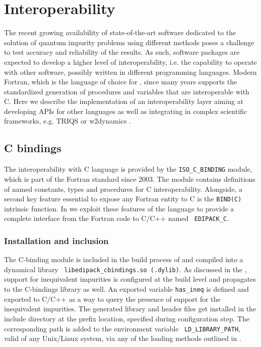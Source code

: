 \documentclass[edipack_sp.tex]{subfiles}
\begin{document}
\section{Interoperability}\label{SecInterop}
The recent growing availability of state-of-the-art software dedicated
to the solution of quantum impurity problems using different methods \cite{Bulla2008RMP,Parcollet2015CPC,Seth2016CPC,Bauernfeind2017PRX,Ganahl2015PRB,Wallerberger2019CPC,Mejuto-Zaera2020PRB}
poses a challenge to test accuracy and reliability of the
results.
As such, software packages are expected to develop a higher level of interoperability, i.e. the capability to operate with other software, possibly written in different programming languages.
Modern Fortran, which is the language of choice for \NAME, since many
years supports the standardized generation of procedures and
variables that are interoperable with C.
Here we describe the implementation of an interoperability layer aiming at developing APIs for other languages as well as 
integrating \NAME in complex scientific frameworks, e.g. TRIQS \cite{Parcollet2015CPC} or w2dynamics \cite{Wallerberger2019CPC}. 

\subsection{C bindings}\label{sSecInteropCbindings}
The interoperability with C language is provided by the
{\tt ISO\_C\_BINDING} module, which is part of the Fortran
standard since 2003\cite{Reid2003CISE,Reid2007SFF}. The module contains definitions of named
constants, types and procedures for C interoperability.
Alongside, a second key feature essential to expose any Fortran entity to C is the {\tt BIND(C)} intrinsic function.
In \NAME we exploit these features of the language to provide a
complete interface from the Fortran code to C/C++ named {\tt
  EDIPACK\_C}. 


\subsubsection{Installation and inclusion}\label{sSecInteropCbindingsInstallation}
The C-binding module is included in the build process of \NAME and
compiled into a dynamical library {\tt
  libedipack\_cbindings.so (.dylib)}. As discussed in the
, support for inequivalent
impurities is configured at the build level and propagates to the
C-bindings library as well. An exported variable {\tt has\_ineq} is
defined and exported to C/C++ as a way to query the presence of support for the inequivalent impurities. 
The generated library and header files get installed in the include
directory at the prefix location, specified during configuration
step. The corresponding path is added to the environment variable {\tt
  LD\_LIBRARY\_PATH}, valid of any Unix/Linux system, via any of the
loading methods outlined in . 
\end{document}
